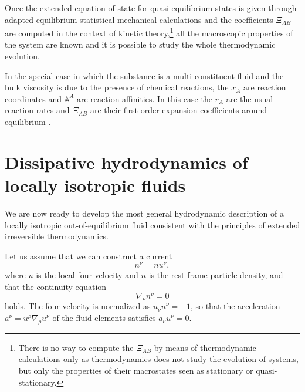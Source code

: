 \documentclass[useAMS,usenatbib,prd,twocolumn,nofootinbib]{revtex4-1}
\begin{document}
Once the extended equation of state for quasi-equilibrium states is given through adapted equilibrium statistical mechanical calculations and the coefficients $\Xi_{AB}$ are computed in the context of kinetic theory,\footnote{
   There is no way to compute the $\Xi_{AB}$ by means of thermodynamic calculations only as thermodynamics does not study the evolution of systems, but only the properties of their macrostates seen as stationary or quasi-stationary.
} all the macroscopic properties of the system are known and it is possible to study the whole thermodynamic evolution.

In the special case in which the substance is a multi-constituent fluid and the bulk viscosity is 
due to the presence of chemical reactions, the $x_A$ are reaction coordinates and $\mathbb{A}^A$ are reaction affinities. In this case the $r_A$ are the usual reaction rates and $\Xi_{AB}$ are their first order expansion coefficients around equilibrium \citep{carter1991,Haskell2012Onsager,Termo}.  

%






\section{Dissipative hydrodynamics of locally isotropic fluids}\label{DHOLIF}


We are now ready to develop the most general hydrodynamic description of a locally isotropic out-of-equilibrium fluid consistent with the principles of extended irreversible thermodynamics.

Let us assume that we can construct a current 
\begin{equation}\label{111}
n^\nu = n u^\nu,
\end{equation} 
where $u$ is the  local four-velocity and $n$ is the rest-frame particle density, and that the continuity equation
\begin{equation}\label{continuity}
\nabla_\nu n^\nu =0
\end{equation} 
holds. The four-velocity is normalized as $u_\nu u^\nu =-1$, so that the acceleration $a^\nu = u^\rho \nabla_\rho u^\nu$ of the fluid elements satisfies  $a_\nu u^\nu =0$.
\end{document}

